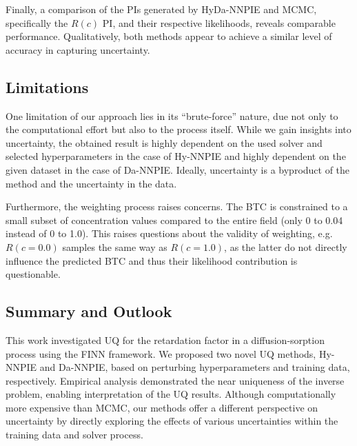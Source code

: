 Finally, a comparison of the PIs generated by HyDa-NNPIE and MCMC, specifically the $R(c)$ PI, and their respective likelihoods, reveals comparable performance. Qualitatively, both methods appear to achieve a similar level of accuracy in capturing uncertainty.


\subsection{Limitations}
One limitation of our approach lies in its ``brute-force'' nature, due not only to the computational effort but also to the process itself. While we gain insights into uncertainty, the obtained result is highly dependent on the used solver and selected hyperparameters in the case of Hy-NNPIE and highly dependent on the given dataset in the case of Da-NNPIE. Ideally, uncertainty is a byproduct of the method and the uncertainty in the data.

Furthermore, the weighting process raises concerns. The BTC is constrained to a small subset of concentration values compared to the entire field (only 0 to 0.04 instead of 0 to 1.0). This raises questions about the validity of weighting, e.g. $R(c=0.0)$ samples the same way as $R(c=1.0)$, as the latter do not directly influence the predicted BTC and thus their likelihood contribution is questionable.


\subsection{Summary and Outlook}
This work investigated UQ for the retardation factor in a diffusion-sorption process using the FINN framework. We proposed two novel UQ methods, Hy-NNPIE and Da-NNPIE, based on perturbing hyperparameters and training data, respectively. Empirical analysis demonstrated the near uniqueness of the inverse problem, enabling interpretation of the UQ results. Although computationally more expensive than MCMC, our methods offer a different perspective on uncertainty by directly exploring the effects of various uncertainties within the training data and solver process.







